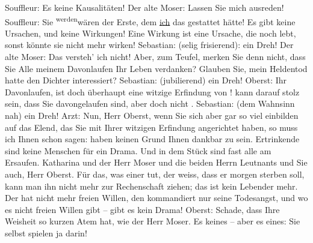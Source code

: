 \begin{ledgroupsized}[t]{13cm}
           \pstart
           Souffleur: Es  keine Kausalitäten!\pend
           \pstart
           Der alte Moser: Lassen Sie mich ausreden!\pend
           \pstart
           Souffleur: Sie \substVorne{}\textsuperscript{werden}{\allowbreak}\substDazwischen{}wären\substHinten{} der Erste, dem \uline{ich} das gestattet hätte! Es
               gibt keine Ursachen, und keine Wirkungen! Eine Wirkung ist eine Ursache, die noch
               lebt, sonst könnte sie nicht mehr wirken!\pend
           \pstart
           Sebastian: (selig frisierend):  ein Dreh!\pend
           \pstart
           Der alte Moser: Das versteh’ ich nicht! Aber, zum Teufel, merken Sie denn nicht, dass
               Sie Alle meinem Davonlaufen Ihr Leben verdanken? Glauben Sie, mein Heldentod hatte
               den Dichter interessiert?\pend
           \pstart
           Sebastian: (jubilierend)  ein Dreh!\pend
           \pstart
           Oberst: Ihr Davonlaufen, ist doch überhaupt eine witzige Erfindung von !  kann darauf stolz sein,
               dass Sie davongelaufen sind, aber doch nicht .\pend
           \pstart
           Sebastian: (dem Wahnsinn nah)  ein Dreh!\pend
           \pstart
           Arzt: Nun, Herr Oberst, wenn Sie sich aber gar so viel einbilden auf das Elend, das
               Sie mit Ihrer witzigen Erfindung angerichtet haben, so muss ich Ihnen schon sagen:
                   haben keinen Grund Ihnen dankbar zu sein.
               Ertrinkende sind keine Menschen für ein Drama. Und in dem Stück sind fast alle am
               Ersaufen. Katharina und der Herr Moser und die beiden Herrn Leutnants und Sie auch,
               Herr Oberst. Für das, was einer tut, der weiss, dass er morgen {\pb}sterben soll, kann man ihn nicht
               mehr zur Rechenschaft ziehen; das ist kein Lebender mehr. Der hat nicht mehr freien
               Willen, den kommandiert nur seine Todesangst, und wo es nicht freien Willen gibt –
               gibt es kein Drama!\pend
           \pstart
           Oberst: Schade, dass Ihre Weisheit so kurzen Atem hat, wie der Herr Moser. Es \label{T_L01900-3v}\label{T_L01900-3h} keines – aber es \label{T_L01900-4v}\label{T_L01900-4h} eines: Sie selbst spielen ja darin!\pend
           \pstart

\end{ledgroupsized}
